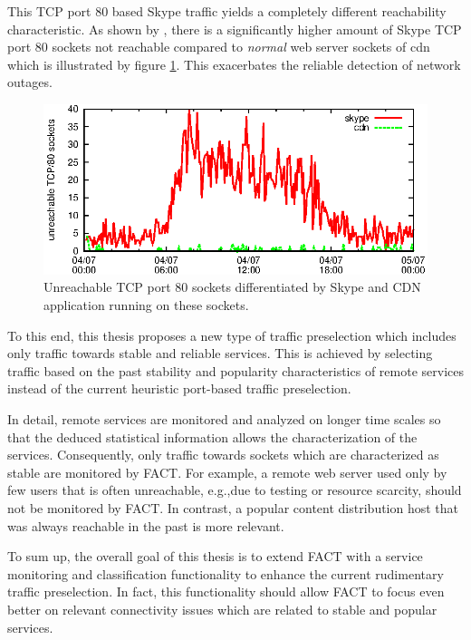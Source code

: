 This \gls{TCP} port 80 based Skype traffic yields a completely different reachability characteristic. As shown by \citet{SchatzmanThesis2012}, there is a significantly higher amount of Skype \gls{TCP} port 80 sockets not reachable compared to \emph{normal} web server sockets of \gls{cdn} which is illustrated by figure \ref{fig:skype_traffic}. This exacerbates the reliable detection of network outages. 

\begin{figure}
	[ht] \centering
	\includegraphics[width=12cm]{images/application_fact.eps}
	\caption{Unreachable TCP port 80 sockets differentiated by Skype and CDN application running on these sockets. \citep{SchatzmanThesis2012}} 
	\label{fig:skype_traffic}
\end{figure}

To this end, this thesis proposes a new type of traffic preselection which includes only traffic towards stable and reliable services. This is achieved by selecting traffic based on the past stability and popularity characteristics of remote services instead of the current heuristic port-based traffic preselection.

In detail, remote services are monitored and analyzed on longer time scales so that the deduced statistical information allows the characterization of the services. Consequently, only traffic towards sockets which are characterized as stable are monitored by \gls{FACT}. For example, a remote web server used only by few users that is often unreachable, e.g.,due to testing or resource scarcity, should not be monitored by \gls{FACT}. In contrast, a popular content distribution host that was always reachable in the past is more relevant. 

To sum up, the overall goal of this thesis is to extend \gls{FACT} with a service monitoring and classification functionality to enhance the current rudimentary traffic preselection. In fact, this functionality should allow \gls{FACT} to focus even better on relevant connectivity issues which are related to stable and popular services.


